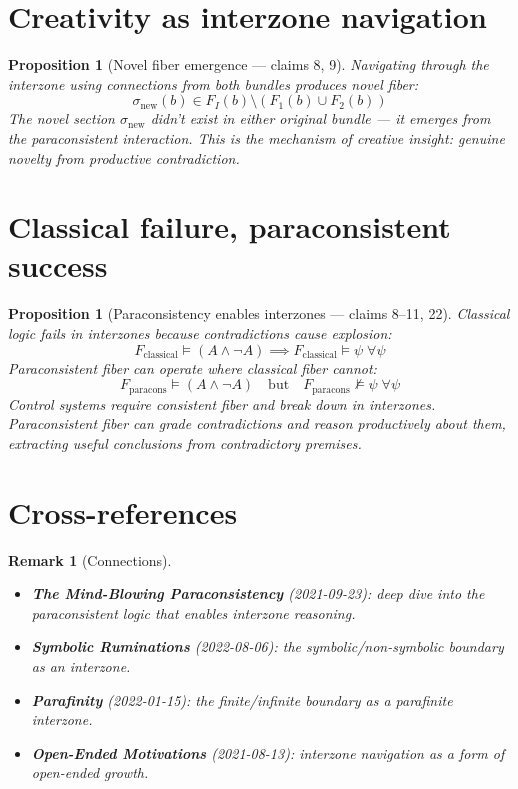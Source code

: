 \documentclass[11pt,a4paper]{article}
\newtheorem{proposition}[definition]{Proposition}
\newtheorem{remark}[definition]{Remark}
\begin{document}
\section{Creativity as interzone navigation}

\begin{proposition}[Novel fiber emergence --- claims 8, 9]
\label{prop:novel}
Navigating through the interzone using connections from both bundles
produces novel fiber:
\[
  \sigma_{\text{new}}(b) \in F_I(b) \setminus (F_1(b) \cup F_2(b))
\]
The novel section $\sigma_{\text{new}}$ didn't exist in either original
bundle --- it emerges from the paraconsistent interaction. This is the
mechanism of creative insight: genuine novelty from productive
contradiction.
\end{proposition}


\section{Classical failure, paraconsistent success}

\begin{proposition}[Paraconsistency enables interzones --- claims 8--11, 22]
Classical logic fails in interzones because contradictions cause explosion:
\[
  F_{\text{classical}} \models (A \wedge \neg A) \implies
  F_{\text{classical}} \models \psi \;\forall\psi
\]
Paraconsistent fiber can operate where classical fiber cannot:
\[
  F_{\text{paracons}} \models (A \wedge \neg A) \quad \text{but} \quad
  F_{\text{paracons}} \not\models \psi \;\forall\psi
\]
Control systems require consistent fiber and break down in interzones.
Paraconsistent fiber can grade contradictions and reason productively
about them, extracting useful conclusions from contradictory premises.
\end{proposition}

\section{Cross-references}

\begin{remark}[Connections]
\begin{itemize}
\item \textbf{The Mind-Blowing Paraconsistency} (2021-09-23): deep dive
  into the paraconsistent logic that enables interzone reasoning.
\item \textbf{Symbolic Ruminations} (2022-08-06): the symbolic/non-symbolic
  boundary as an interzone.
\item \textbf{Parafinity} (2022-01-15): the finite/infinite boundary as
  a parafinite interzone.
\item \textbf{Open-Ended Motivations} (2021-08-13): interzone navigation
  as a form of open-ended growth.
\end{itemize}
\end{remark}
\end{document}
